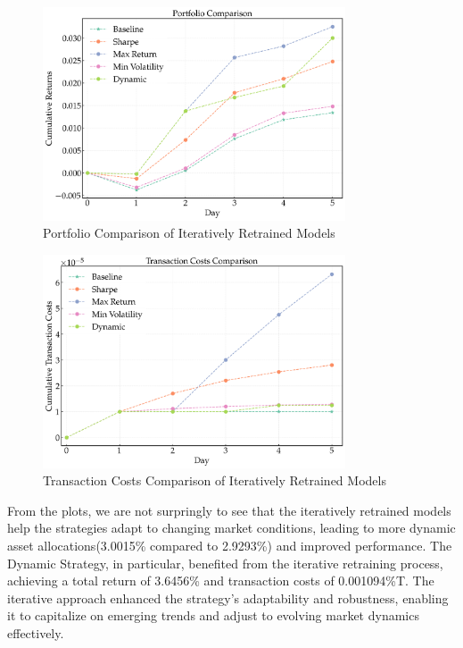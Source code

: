 \begin{figure}[htbp]
    \centering
    \includegraphics[width=0.8\textwidth]{figures/portfolio_comparison_final.png}
    \caption{Portfolio Comparison of Iteratively Retrained Models}
    \label{fig:portfolio_comparison_iterative}
\end{figure}


\begin{figure}[htbp]
    \centering
    \includegraphics[width=0.8\textwidth]{figures/trx_costs_comparison_final.png}
    \caption{Transaction Costs Comparison of Iteratively Retrained Models}
    \label{fig:trx_costs_comparison_iterative}
\end{figure}

From the plots, we are not surpringly to see that the iteratively retrained models help the strategies adapt to changing market conditions, leading to more dynamic asset allocations(3.0015\% compared to 2.9293\%) and improved performance. 
The Dynamic Strategy, in particular, benefited from the iterative retraining process, achieving a total return of 3.6456\% and transaction costs of 0.001094\%T. The iterative approach enhanced the strategy's adaptability and robustness, enabling it to capitalize on emerging trends and adjust to evolving market dynamics effectively.

